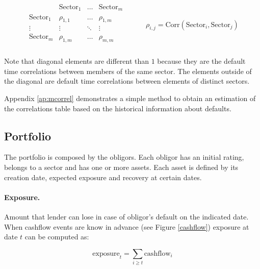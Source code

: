 \documentclass[a4paper,12pt,final]{article}
\begin{document}
\begin{center}
\begin{displaymath}
\begin{array}{cc}
\begin{array}{c|ccc}
                    & \mathrm{Sector}_1 & \dots  & \mathrm{Sector}_{m} \\
\hline
\mathrm{Sector}_1   & \rho_{1,1}        & \dots  & \rho_{1,m} \\
\vdots              & \vdots            & \ddots & \vdots     \\
\mathrm{Sector}_{m} & \rho_{1,m}        & \dots  & \rho_{m,m} \\
\end{array}
&
\qquad \rho_{i,j} = \mathrm{Corr}(\mathrm{Sector}_i, \mathrm{Sector}_j)
\end{array}
\end{displaymath}
\end{center}

Note that diagonal elements are different than $1$ because they are the default time 
correlations between members of the same sector. The elements outside of the
diagonal are default time correlations between elements of distinct sectors.
\newline

Appendix \ref{ap:mcorrel} demonstrates a simple method to obtain an estimation of
the correlations table based on the historical information about defaults.

\subsection{Portfolio}
The portfolio is composed by the obligors. Each obligor has an initial rating, 
belongs to a sector and has one or more assets. Each asset
is defined by its creation date, expected exposure and recovery at certain 
dates.

\paragraph{Exposure.} Amount that lender can lose in case of obligor's default 
on the indicated date. When cashflow events are know in advance (see Figure 
\ref{cashflow}) exposure at date $t$ can be computed as:

\begin{displaymath}
\mathrm{exposure}_{t} = \sum_{i \ge t} \mathrm{cashflow}_{i}
\end{displaymath}
\end{document}
